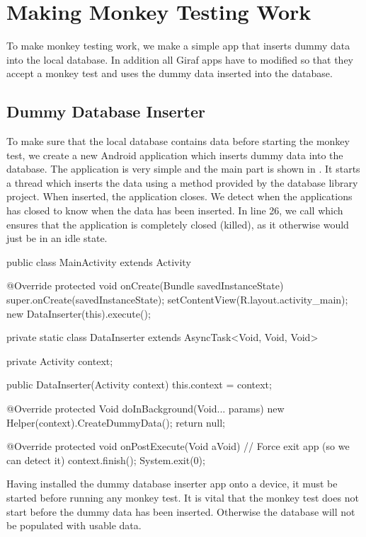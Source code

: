 \chapter{Making Monkey Testing Work}
To make monkey testing work, we make a simple app that inserts dummy data into the local database. In addition all Giraf apps have to modified so that they accept a monkey test and uses the dummy data inserted into the database.

\section{Dummy Database Inserter}
To make sure that the local database contains data before starting the monkey test, we create a new Android application which inserts dummy data into the database. The application is very simple and the main part is shown in . It starts a thread which inserts the data using a method provided by the database library project. When inserted, the application closes. We detect when the applications has closed to know when the data has been inserted. In line 26, we call  which ensures that the application is completely closed (killed), as it otherwise would just be in an idle state.

\begin{javacode}[caption=Dummy database inserter \mono{MainActivity},label=lst:dummy_db_ins_main_activity]
public class MainActivity extends Activity {
    @Override
    protected void onCreate(Bundle savedInstanceState) {
        super.onCreate(savedInstanceState);
        setContentView(R.layout.activity_main);
        new DataInserter(this).execute();
    }

    private static class DataInserter extends AsyncTask<Void, Void, Void> {
        private Activity context;

        public DataInserter(Activity context) {
            this.context = context;
        }

        @Override
        protected Void doInBackground(Void... params) {
            new Helper(context).CreateDummyData();
            return null;
        }

        @Override
        protected void onPostExecute(Void aVoid) {
            // Force exit app (so we can detect it)
            context.finish();
            System.exit(0);
        }
    }
}
\end{javacode}

Having installed the dummy database inserter app onto a device, it must be started before running any monkey test. It is vital that the monkey test does not start before the dummy data has been inserted. Otherwise the database will not be populated with usable data.

